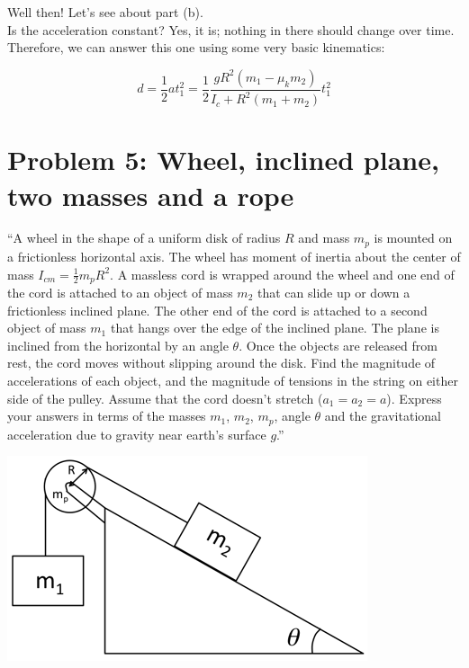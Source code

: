 \documentclass[8.01x]{subfiles}
\begin{document}
Well then! Let's see about part (b).\\
Is the acceleration constant? Yes, it is; nothing in there should change over time. Therefore, we can answer this one using some very basic kinematics:

\begin{equation}
d = \frac{1}{2} a t_1^2 = \frac{1}{2} \frac{g R^2 (m_1 - \mu_k m_2)}{I_c + R^2 (m_1 + m_2)} t_1^2
\end{equation}

\section{Problem 5: Wheel, inclined plane, two masses and a rope}

``A wheel in the shape of a uniform disk of radius $R$ and mass $m_p$ is mounted on a frictionless horizontal axis. The wheel has moment of inertia about the center of mass $\displaystyle I_{cm} = \frac{1}{2} m_p R^2$. A massless cord is wrapped around the wheel and one end of the cord is attached to an object of mass $m_2$ that can slide up or down a frictionless inclined plane. The other end of the cord is attached to a second object of mass $m_1$ that hangs over the edge of the inclined plane. The plane is inclined from the horizontal by an angle $\theta$. Once the objects are released from rest, the cord moves without slipping around the disk. Find the magnitude of accelerations of each object, and the magnitude of tensions in the string on either side of the pulley. Assume that the cord doesn't stretch ($a_1 = a_2 = a$). Express your answers in terms of the masses $m_1$, $m_2$, $m_p$, angle $\theta$ and the gravitational acceleration due to gravity near earth's surface $g$.''

\begin{center}
\includegraphics[scale=0.5]{Graphics/h8p5}
\end{center}
\end{document}
